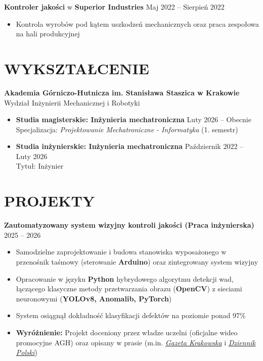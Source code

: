 \documentclass[a4paper,10pt]{extarticle}
\begin{document}
\vspace{0.15cm}
\noindent
\textbf{Kontroler jakości} w \textbf{Superior Industries} \hfill Maj 2022 – Sierpień 2022
\begin{itemize}
    \item Kontrola wyrobów pod kątem uszkodzeń mechanicznych oraz praca zespołowa na hali produkcyjnej
\end{itemize}

\section*{WYKSZTAŁCENIE}
\noindent
\textbf{Akademia Górniczo-Hutnicza im. Stanisława Staszica w Krakowie} \\
Wydział Inżynierii Mechanicznej i Robotyki 
\begin{itemize}
    \item \textbf{Studia magisterskie: Inżynieria mechatroniczna} \hfill Luty 2026 – Obecnie \\
    Specjalizacja: \textit{Projektowanie Mechatroniczne - Informatyka} (1. semestr)
    \item \textbf{Studia inżynierskie: Inżynieria mechatroniczna} \hfill Październik 2022 – Luty 2026 \\
    Tytuł: Inżynier
\end{itemize}

\section*{PROJEKTY}

\noindent
\textbf{Zautomatyzowany system wizyjny kontroli jakości (Praca inżynierska)} \hfill 2025 – 2026
\begin{itemize}
    \item Samodzielne zaprojektowanie i budowa stanowiska wyposażonego w przenośnik taśmowy (sterowanie \textbf{Arduino}) oraz zintegrowany system wizyjny
    \item Opracowanie w języku \textbf{Python} hybrydowego algorytmu detekcji wad, łączącego klasyczne metody przetwarzania obrazu (\textbf{OpenCV}) z sieciami neuronowymi (\textbf{YOLOv8, Anomalib, PyTorch})
    \item System osiągnął dokładność klasyfikacji defektów na poziomie ponad 97\%
    \item \textbf{Wyróżnienie:} Projekt doceniony przez władze uczelni (oficjalne wideo promocyjne AGH) oraz opisany w prasie (m.in. \href{https://gazetakrakowska.pl/student-krakowskiej-agh-zaprojektowal-system-do-zautomatyzowanej-kontroli-jakosci-ciastek/gh/c1p2-28735765}{\textit{Gazeta Krakowska}} i \href{https://dziennikpolski24.pl/student-krakowskiej-agh-zaprojektowal-system-do-zautomatyzowanej-kontroli-jakosci-ciastek/ar/c1p2-28735765}{\textit{Dziennik Polski}})
\end{itemize}
\end{document}
